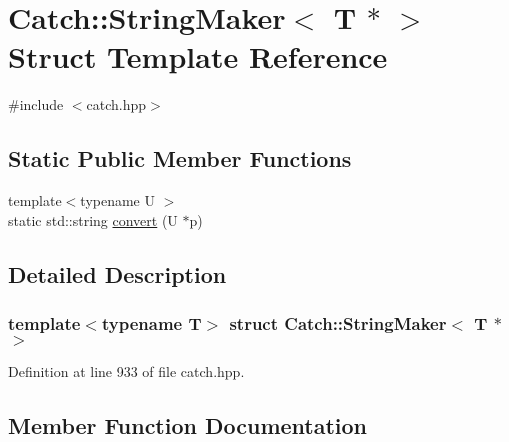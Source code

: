 \hypertarget{struct_catch_1_1_string_maker_3_01_t_01_5_01_4}{}\section{Catch\+:\+:String\+Maker$<$ T $\ast$ $>$ Struct Template Reference}
\label{struct_catch_1_1_string_maker_3_01_t_01_5_01_4}


{\ttfamily \#include $<$catch.\+hpp$>$}

\subsection*{Static Public Member Functions}
\begin{DoxyCompactItemize}
\item 
{\footnotesize template$<$typename U $>$ }\\static std\+::string \mbox{\hyperlink{struct_catch_1_1_string_maker_3_01_t_01_5_01_4_a2adbc75c99d71b8323f4052bcb0815c9}{convert}} (U $\ast$p)
\end{DoxyCompactItemize}


\subsection{Detailed Description}
\subsubsection*{template$<$typename T$>$\newline
struct Catch\+::\+String\+Maker$<$ T $\ast$ $>$}



Definition at line 933 of file catch.\+hpp.



\subsection{Member Function Documentation}
\mbox{\label{struct_catch_1_1_string_maker_3_01_t_01_5_01_4_a2adbc75c99d71b8323f4052bcb0815c9}} 
